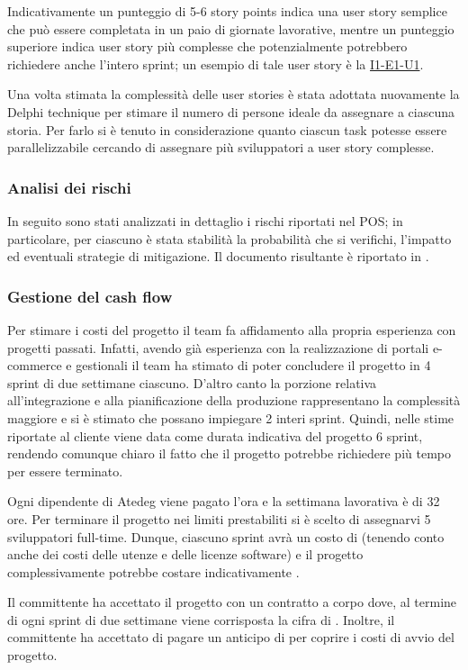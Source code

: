 Indicativamente un punteggio di 5-6 story points indica una user story semplice che può essere completata in un paio di giornate lavorative, mentre un punteggio superiore indica user story più complesse che potenzialmente potrebbero richiedere anche l'intero sprint; un esempio di tale user story è la \href{user-story:i1-e1-u1}{I1-E1-U1}.

Una volta stimata la complessità delle user stories è stata adottata nuovamente la Delphi technique per stimare il numero di persone ideale da assegnare a ciascuna storia. Per farlo si è tenuto in considerazione quanto ciascun task potesse essere parallelizzabile cercando di assegnare più sviluppatori a user story complesse.

\subsubsection{Analisi dei rischi}
In seguito sono stati analizzati in dettaglio i rischi riportati nel POS; in particolare, per ciascuno è stata stabilità la probabilità che si verifichi, l'impatto ed eventuali strategie di mitigazione. Il documento risultante è riportato in .

\subsubsection{Gestione del cash flow}
Per stimare i costi del progetto il team fa affidamento alla propria esperienza con progetti passati. Infatti, avendo già esperienza con la realizzazione di portali e-commerce e gestionali il team ha stimato di poter concludere il progetto in 4 sprint di due settimane ciascuno. D'altro canto la porzione relativa all'integrazione e alla pianificazione della produzione rappresentano la complessità maggiore e si è stimato che possano impiegare 2 interi sprint.
Quindi, nelle stime riportate al cliente viene data come durata indicativa del progetto 6 sprint, rendendo comunque chiaro il fatto che il progetto potrebbe richiedere più tempo per essere terminato.

Ogni dipendente di Atedeg viene pagato  l'ora e la settimana lavorativa è di 32 ore. Per terminare il progetto nei limiti prestabiliti si è scelto di assegnarvi 5 sviluppatori full-time. Dunque, ciascuno sprint avrà un costo di  (tenendo conto anche dei costi delle utenze e delle licenze software) e il progetto complessivamente potrebbe costare indicativamente .

Il committente ha accettato il progetto con un contratto a corpo dove, al termine di ogni sprint di due settimane viene corrisposta la cifra di .
Inoltre, il committente ha accettato di pagare un anticipo di  per coprire i costi di avvio del progetto.
